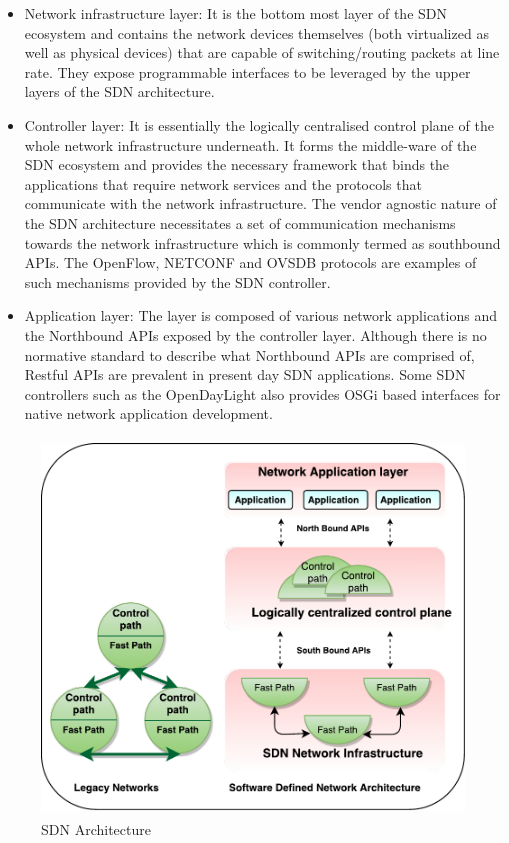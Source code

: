 \begin{itemize}
	\item Network infrastructure layer: It is the bottom most layer of the SDN ecosystem and contains the network devices themselves (both virtualized as well as physical devices) that are capable of switching/routing packets at line rate. They expose programmable interfaces to be leveraged by the upper layers of the SDN architecture.
	\item Controller layer: It is essentially the logically centralised control plane of the whole network infrastructure underneath. It forms the middle-ware of the SDN ecosystem and provides the necessary framework that binds the applications that require network services and the protocols that communicate with the network infrastructure. The vendor agnostic nature of the SDN architecture necessitates a set of communication mechanisms towards the network infrastructure which is commonly termed as southbound APIs. The OpenFlow, NETCONF and OVSDB protocols are examples of such mechanisms provided by the SDN controller. 
	\item Application layer: The layer is composed of various network applications and the Northbound APIs exposed by the controller layer. Although there is no normative standard to describe what  Northbound APIs are comprised of, Restful APIs are prevalent in present day SDN applications. Some SDN controllers such as the OpenDayLight also provides OSGi based interfaces for native network application development.
\end{itemize}


\begin{figure}[H]
	\centering
	\caption{SDN Architecture}
	\includegraphics[height=10cm]{SDN-Architecture05.pdf}
\end{figure}



